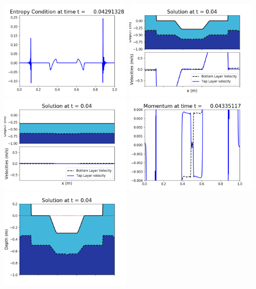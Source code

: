 \documentclass[11pt]{article}
\begin{document}
\vskip 10pt 
\includegraphics[width=0.475\textwidth]{frame0099fig1009.png}
\vskip 10pt 
\includegraphics[width=0.475\textwidth]{frame0100fig1001.png}
\includegraphics[width=0.475\textwidth]{frame0100fig1002.png}
\vskip 10pt 
\includegraphics[width=0.475\textwidth]{frame0100fig1003.png}
\includegraphics[width=0.475\textwidth]{frame0100fig1006.png}
\end{document}

